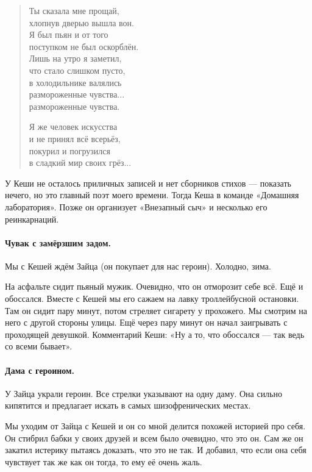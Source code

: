 \documentclass{book}
\begin{document}
\begin{verse}
Ты сказала мне прощай,\\
\quad хлопнув дверью вышла вон.\\
Я был пьян и от того\\
\quad 
поступком не был оскорблён.\\
Лишь на утро я заметил,\\
\quad 
что стало слишком пусто,\\
в холодильнике валялись \\
\quad 
размороженные чувства...\\
\quad \quad размороженные чувства.

Я же человек искусства\\
\quad 
и не принял всё всерьёз,\\
покурил и погрузился\\
\quad 
в сладкий мир своих грёз...
\end{verse}

У Кеши не осталось приличных записей и нет сборников стихов --- показать нечего, но это главный поэт моего времени.
Тогда Кеша в команде «Домашняя лаборатория».
Позже он организует «Внезапный сыч» и несколько его реинкарнаций.

\paragraph{Чувак с замёрзшим задом.}
Мы с Кешей ждём Зайца (он покупает для нас героин).
Холодно, зима.

На асфальте сидит пьяный мужик.
Очевидно, что он отморозит себе всё.
Ещё и обоссался.
Вместе с Кешей мы его сажаем на лавку троллейбусной остановки.
Там он сидит пару минут, потом стреляет сигарету у прохожего.
Мы смотрим на него с другой стороны улицы.
Ещё через пару минут он начал заигрывать с проходящей девушкой.
Комментарий Кеши: «Ну а то, что обоссался --- так ведь со всеми бывает».

\paragraph{Дама с героином.}
У Зайца украли героин.
Все стрелки указывают на одну даму.
Она сильно кипятится и предлагает искать в самых шизофренических местах.

Мы уходим от Зайца с Кешей и он со мной делится похожей историей про себя.
Он стибрил бабки у своих друзей и всем было очевидно, что это он.
Сам же он закатил истерику пытаясь доказать, что это не так.
И добавил, что если она себя чувствует так же как он тогда, то ему её очень жаль.
\end{document}
